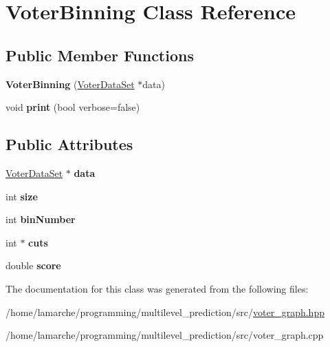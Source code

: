 \hypertarget{class_voter_binning}{\section{Voter\-Binning Class Reference}
\label{class_voter_binning}
}
\subsection*{Public Member Functions}
\begin{DoxyCompactItemize}
\item 
\hypertarget{class_voter_binning_a4626ce3a1bb1aa2108afcfd63af89305}{{\bfseries Voter\-Binning} (\hyperlink{class_voter_data_set}{Voter\-Data\-Set} $\ast$data)}\label{class_voter_binning_a4626ce3a1bb1aa2108afcfd63af89305}

\item 
\hypertarget{class_voter_binning_acf647389a12d6e0838fec89eee8df72e}{void {\bfseries print} (bool verbose=false)}\label{class_voter_binning_acf647389a12d6e0838fec89eee8df72e}

\end{DoxyCompactItemize}
\subsection*{Public Attributes}
\begin{DoxyCompactItemize}
\item 
\hypertarget{class_voter_binning_abfb5cba676d4523a0db4253da90defd4}{\hyperlink{class_voter_data_set}{Voter\-Data\-Set} $\ast$ {\bfseries data}}\label{class_voter_binning_abfb5cba676d4523a0db4253da90defd4}

\item 
\hypertarget{class_voter_binning_a301ba12a243476ac1b7f7bdaa2bdf4b4}{int {\bfseries size}}\label{class_voter_binning_a301ba12a243476ac1b7f7bdaa2bdf4b4}

\item 
\hypertarget{class_voter_binning_a58e6aa4792f0b7f22794597742eb44a6}{int {\bfseries bin\-Number}}\label{class_voter_binning_a58e6aa4792f0b7f22794597742eb44a6}

\item 
\hypertarget{class_voter_binning_a5226a976c3ac9a43e9ed485d9de2712a}{int $\ast$ {\bfseries cuts}}\label{class_voter_binning_a5226a976c3ac9a43e9ed485d9de2712a}

\item 
\hypertarget{class_voter_binning_a9d385619fee2689a5530cc8e06f44d37}{double {\bfseries score}}\label{class_voter_binning_a9d385619fee2689a5530cc8e06f44d37}

\end{DoxyCompactItemize}


The documentation for this class was generated from the following files\-:\begin{DoxyCompactItemize}
\item 
/home/lamarche/programming/multilevel\-\_\-prediction/src/\hyperlink{voter__graph_8hpp}{voter\-\_\-graph.\-hpp}\item 
/home/lamarche/programming/multilevel\-\_\-prediction/src/voter\-\_\-graph.\-cpp\end{DoxyCompactItemize}

